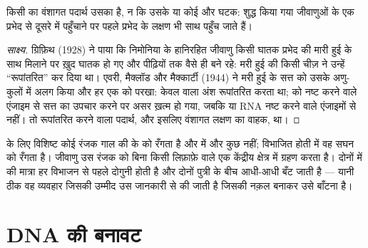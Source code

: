 \begin{proposition}[DNA ही आनुवंशिकता का अणु है]\label{prop:g10:universal-dna:material}
किसी  का वंशागत पदार्थ उसका  है, न कि उसके  या कोई और
घटक: शुद्ध किया गया  जीवाणुओं के एक प्रभेद से दूसरे में पहुँचाने पर
पहले प्रभेद के लक्षण भी साथ पहुँच जाते हैं।
\end{proposition}
\begin{proof}[साक्ष्य]
ग्रिफ़िथ (1928) ने पाया कि निमोनिया के हानिरहित जीवाणु किसी घातक प्रभेद
की मारी हुई  के साथ मिलाने पर ख़ुद घातक हो गए और पीढ़ियों तक
वैसे ही बने रहे: मरी हुई  की किसी चीज़ ने उन्हें
``रूपांतरित'' कर दिया था। एवरी, मैक्लॉड और मैक्कार्टी (1944) ने मरी हुई
 के सत्त को उसके अणु-कुलों में अलग किया और हर एक को परखा: केवल
 वाला अंश रूपांतरित करता था;  को नष्ट करने वाले एंजाइम से सत्त का
उपचार करने पर असर ख़त्म हो गया, जबकि  या RNA नष्ट करने वाले
एंजाइमों से नहीं। तो रूपांतरित करने वाला पदार्थ, और इसलिए वंशागत लक्षण का
वाहक,  था।
\end{proof}

\begin{example}[DNA है कहाँ]\label{ex:g10:universal-dna:where}
 के लिए विशिष्ट कोई रंजक गाल की  के  को रँगता है और
 में और कुछ नहीं; विभाजित होती  में वह सघन 
को रँगता है। जीवाणु उस रंजक को बिना किसी लिफ़ाफ़े वाले एक केंद्रीय
क्षेत्र में ग्रहण करता है। दोनों में  की मात्रा हर विभाजन से पहले
दोगुनी होती है और दोनों पुत्री  के बीच आधी-आधी बँट जाती है ---
यानी ठीक वह व्यवहार जिसकी उम्मीद उस जानकारी से की जाती है जिसकी नक़ल
बनाकर उसे बाँटना है।
\end{example}

\section{DNA की बनावट}

